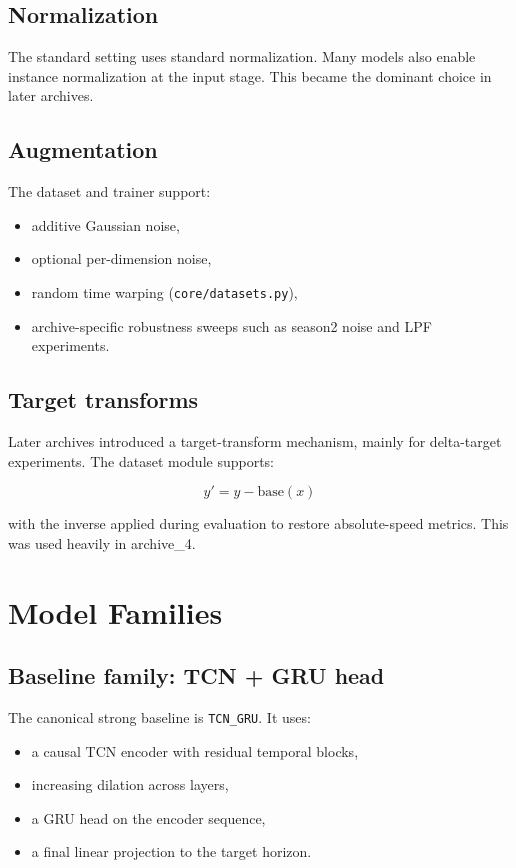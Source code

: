 \documentclass[11pt,a4paper]{article}
\begin{document}
\subsection{Normalization}

The standard setting uses standard normalization. Many models also enable instance normalization at the input stage. This became the dominant choice in later archives.

\subsection{Augmentation}

The dataset and trainer support:

\begin{itemize}
\item additive Gaussian noise,
\item optional per-dimension noise,
\item random time warping (\texttt{core/datasets.py}),
\item archive-specific robustness sweeps such as season2 noise and LPF experiments.
\end{itemize}

\subsection{Target transforms}

Later archives introduced a target-transform mechanism, mainly for delta-target experiments. The dataset module supports:

\[
y' = y - \text{base}(x)
\]

with the inverse applied during evaluation to restore absolute-speed metrics. This was used heavily in archive\_4.

\section{Model Families}

\subsection{Baseline family: TCN + GRU head}

The canonical strong baseline is \texttt{TCN\_GRU}. It uses:

\begin{itemize}
\item a causal TCN encoder with residual temporal blocks,
\item increasing dilation across layers,
\item a GRU head on the encoder sequence,
\item a final linear projection to the target horizon.
\end{itemize}
\end{document}
